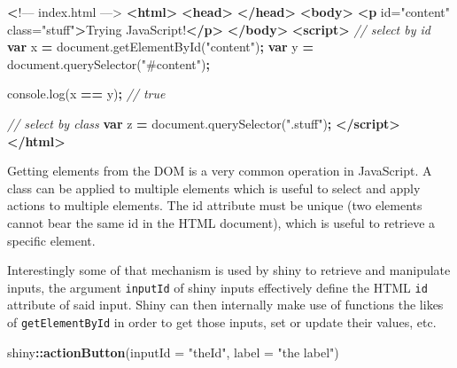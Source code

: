 \documentclass[
]{krantz}
\makeatletter
\newenvironment{Shaded}{\begin{snugshade}}{\end{snugshade}}
\newcommand{\AttributeTok}[1]{\textcolor[rgb]{0.61,0.61,0.61}{#1}}
\newcommand{\CommentTok}[1]{\textcolor[rgb]{0.37,0.37,0.37}{\textit{#1}}}
\newcommand{\DataTypeTok}[1]{\textcolor[rgb]{0.27,0.27,0.27}{#1}}
\newcommand{\ErrorTok}[1]{\textcolor[rgb]{0.14,0.14,0.14}{\textbf{#1}}}
\newcommand{\KeywordTok}[1]{\textcolor[rgb]{0.27,0.27,0.27}{\textbf{#1}}}
\newcommand{\NormalTok}[1]{#1}
\newcommand{\OperatorTok}[1]{\textcolor[rgb]{0.43,0.43,0.43}{\textbf{#1}}}
\newcommand{\OtherTok}[1]{\textcolor[rgb]{0.37,0.37,0.37}{#1}}
\newcommand{\StringTok}[1]{\textcolor[rgb]{0.5,0.5,0.5}{#1}}
\newcommand{\VariableTok}[1]{\textcolor[rgb]{0,0,0}{#1}}
\newenvironment{kframe}{%
\medskip{}
\setlength{\fboxsep}{.8em}
 \def\at@end@of@kframe{}%
 \ifinner\ifhmode%
  \def\at@end@of@kframe{\end{minipage}}%
  \begin{minipage}{\columnwidth}%
 \fi\fi%
 \def\FrameCommand##1{\hskip\@totalleftmargin \hskip-\fboxsep
 \colorbox{shadecolor}{##1}\hskip-\fboxsep
     \hskip-\linewidth \hskip-\@totalleftmargin \hskip\columnwidth}%
 \MakeFramed {\advance\hsize-\width
   \@totalleftmargin\z@ \linewidth\hsize
   \@setminipage}}%
 {\par\unskip\endMakeFramed%
 \at@end@of@kframe}
\renewenvironment{Shaded}{\begin{kframe}}{\end{kframe}}
\makeatother
\begin{document}
\begin{Shaded}
\begin{Highlighting}[]
 \ErrorTok{<}\NormalTok{!–– index.html ––>}
\KeywordTok{<html>}
  \KeywordTok{<head>}
  \KeywordTok{</head>}
  \KeywordTok{<body>}
    \KeywordTok{<p}\OtherTok{ id=}\StringTok{"content"}\OtherTok{ class=}\StringTok{"stuff"}\KeywordTok{>}\NormalTok{Trying JavaScript!}\KeywordTok{</p>}
  \KeywordTok{</body>}
  \KeywordTok{<script>}
    \CommentTok{// select by id}
    \KeywordTok{var}\NormalTok{ x }\OperatorTok{=} \VariableTok{document}\NormalTok{.}\AttributeTok{getElementById}\NormalTok{(}\StringTok{"content"}\NormalTok{)}\OperatorTok{;}
    \KeywordTok{var}\NormalTok{ y }\OperatorTok{=} \VariableTok{document}\NormalTok{.}\AttributeTok{querySelector}\NormalTok{(}\StringTok{"\#content"}\NormalTok{)}\OperatorTok{;}

    \VariableTok{console}\NormalTok{.}\AttributeTok{log}\NormalTok{(x }\OperatorTok{==}\NormalTok{ y)}\OperatorTok{;} \CommentTok{// true}

    \CommentTok{// select by class}
    \KeywordTok{var}\NormalTok{ z }\OperatorTok{=} \VariableTok{document}\NormalTok{.}\AttributeTok{querySelector}\NormalTok{(}\StringTok{".stuff"}\NormalTok{)}\OperatorTok{;}
  \KeywordTok{</script>}
\KeywordTok{</html>}
\end{Highlighting}
\end{Shaded}

Getting elements from the DOM is a very common operation in JavaScript. A class can be applied to multiple elements which is useful to select and apply actions to multiple elements. The id attribute must be unique (two elements cannot bear the same id in the HTML document), which is useful to retrieve a specific element.

Interestingly some of that mechanism is used by shiny to retrieve and manipulate inputs, the argument \texttt{inputId} of shiny inputs effectively define the HTML \texttt{id} attribute of said input. Shiny can then internally make use of functions the likes of \texttt{getElementById} in order to get those inputs, set or update their values, etc.

\begin{Shaded}
\begin{Highlighting}[]
\NormalTok{shiny}\OperatorTok{::}\KeywordTok{actionButton}\NormalTok{(}\DataTypeTok{inputId =} \StringTok{"theId"}\NormalTok{, }\DataTypeTok{label =} \StringTok{"the label"}\NormalTok{) }
\end{Highlighting}
\end{Shaded}
\end{document}
